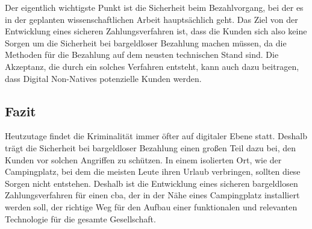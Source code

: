 Der eigentlich wichtigste Punkt ist die Sicherheit beim Bezahlvorgang, bei der es in der geplanten wissenschaftlichen 
Arbeit hauptsächlich geht. Das Ziel von der Entwicklung eines sicheren Zahlungsverfahren ist, dass die Kunden sich
also keine Sorgen um die Sicherheit bei bargeldloser Bezahlung machen müssen, da die Methoden für die Bezahlung 
auf dem neusten technischen Stand sind. Die Akzeptanz, die durch ein solches Verfahren entsteht, kann auch dazu beitragen,
dass Digital Non-Natives potenzielle Kunden werden.

\subsection{Fazit}

Heutzutage findet die Kriminalität immer öfter auf digitaler Ebene statt. Deshalb trägt die Sicherheit bei 
bargeldloser Bezahlung einen großen Teil dazu bei, den Kunden vor solchen Angriffen zu schützen. In einem isolierten Ort,
wie der Campingplatz, bei dem die meisten Leute ihren Urlaub verbringen, sollten diese Sorgen nicht entstehen. Deshalb
ist die Entwicklung eines sicheren bargeldlosen Zahlungsverfahren für einen \acrfull{cba}, der in der Nähe eines 
Campingplatz installiert werden soll, der richtige Weg für den Aufbau einer funktionalen und relevanten Technologie
für die gesamte Gesellschaft.